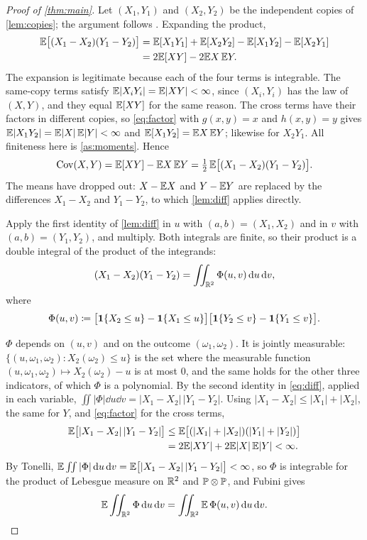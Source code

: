 \documentclass{saim-blog}
\begin{document}
\begin{proof}[Proof of \cref{thm:main}]
Let $(X_1,Y_1)$ and $(X_2,Y_2)$ be the independent copies of \cref{lem:copies}; the argument follows \citet{lehmann1966}. Expanding the product,
\[
\begin{aligned}
\mathbb{E}\big[(X_1-X_2)(Y_1-Y_2)\big]&=\mathbb{E}[X_1Y_1]+\mathbb{E}[X_2Y_2]-\mathbb{E}[X_1Y_2]-\mathbb{E}[X_2Y_1]\\
&=2\mathbb{E}[XY]-2\mathbb{E} X\,\mathbb{E} Y .
\end{aligned}
\]
The expansion is legitimate because each of the four terms is integrable. The same-copy terms satisfy $\mathbb{E}|X_iY_i|=\mathbb{E}|XY|<\infty$, since $(X_i,Y_i)$ has the law of $(X,Y)$, and they equal $\mathbb{E}[XY]$ for the same reason. The cross terms have their factors in different copies, so \eqref{eq:factor} with $g(x,y)=x$ and $h(x,y)=y$ gives $\mathbb{E}|X_1Y_2|=\mathbb{E}|X|\,\mathbb{E}|Y|<\infty$ and $\mathbb{E}[X_1Y_2]=\mathbb{E} X\,\mathbb{E} Y$; likewise for $X_2Y_1$. All finiteness here is \cref{as:moments}. Hence
\begin{equation}\label{eq:sym}
\operatorname{Cov}(X,Y)=\mathbb{E}[XY]-\mathbb{E} X\,\mathbb{E} Y=\tfrac12\,\mathbb{E}\big[(X_1-X_2)(Y_1-Y_2)\big].
\end{equation}
The means have dropped out: $X-\mathbb{E} X$ and $Y-\mathbb{E} Y$ are replaced by the differences $X_1-X_2$ and $Y_1-Y_2$, to which \cref{lem:diff} applies directly.

Apply the first identity of \cref{lem:diff} in $u$ with $(a,b)=(X_1,X_2)$ and in $v$ with $(a,b)=(Y_1,Y_2)$, and multiply. Both integrals are finite, so their product is a double integral of the product of the integrands:
\begin{equation}\label{eq:product}
(X_1-X_2)(Y_1-Y_2)=\iint_{\mathbb{R}^2}\Phi(u,v)\mathop{}\!\mathrm{d} u\mathop{}\!\mathrm{d} v,
\end{equation}
where
\[
\Phi(u,v)\coloneqq\big[\mathbf{1}\{X_2\le u\}-\mathbf{1}\{X_1\le u\}\big]\big[\mathbf{1}\{Y_2\le v\}-\mathbf{1}\{Y_1\le v\}\big].
\]

$\Phi$ depends on $(u,v)$ and on the outcome $(\omega_1,\omega_2)$. It is jointly measurable: $\{(u,\omega_1,\omega_2):X_2(\omega_2)\le u\}$ is the set where the measurable function $(u,\omega_1,\omega_2)\mapsto X_2(\omega_2)-u$ is at most $0$, and the same holds for the other three indicators, of which $\Phi$ is a polynomial. By the second identity in \eqref{eq:diff}, applied in each variable, $\iint|\Phi|\dd u\dd v=|X_1-X_2|\,|Y_1-Y_2|$. Using $|X_1-X_2|\le|X_1|+|X_2|$, the same for $Y$, and \eqref{eq:factor} for the cross terms,
\begin{equation}\label{eq:bound}
\begin{aligned}
\mathbb{E}\big[|X_1-X_2|\,|Y_1-Y_2|\big]&\le\mathbb{E}\big[(|X_1|+|X_2|)(|Y_1|+|Y_2|)\big]\\
&=2\mathbb{E}|XY|+2\mathbb{E}|X|\,\mathbb{E}|Y|<\infty .
\end{aligned}
\end{equation}
By Tonelli, $\mathbb{E}\iint|\Phi|\mathop{}\!\mathrm{d} u\mathop{}\!\mathrm{d} v=\mathbb{E}\big[|X_1-X_2|\,|Y_1-Y_2|\big]<\infty$, so $\Phi$ is integrable for the product of Lebesgue measure on $\mathbb{R}^2$ and $\mathbb{P}\otimes\mathbb{P}$, and Fubini gives
\[
\mathbb{E}\iint_{\mathbb{R}^2}\Phi\mathop{}\!\mathrm{d} u\mathop{}\!\mathrm{d} v=\iint_{\mathbb{R}^2}\mathbb{E}\,\Phi(u,v)\mathop{}\!\mathrm{d} u\mathop{}\!\mathrm{d} v .
\]


\end{proof}
\end{document}
